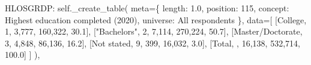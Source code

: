 \documentclass[
  11pt,
  a4paper,
]{article}
\newenvironment{Shaded}{\begin{snugshade}}{\end{snugshade}}
\newcommand{\NormalTok}[1]{\textcolor[rgb]{0.00,0.23,0.31}{#1}}
\newcommand{\OperatorTok}[1]{\textcolor[rgb]{0.37,0.37,0.37}{#1}}
\newcommand{\StringTok}[1]{\textcolor[rgb]{0.13,0.47,0.30}{#1}}
\newcommand{\VariableTok}[1]{\textcolor[rgb]{0.07,0.07,0.07}{#1}}
\begin{document}
\begin{Shaded}
\begin{Highlighting}[]
    \StringTok{\textquotesingle{}HLOSGRDP\textquotesingle{}}\NormalTok{: }\VariableTok{self}\NormalTok{.\_create\_table(}
\NormalTok{        meta}\OperatorTok{=}\NormalTok{\{}
            \StringTok{\textquotesingle{}length\textquotesingle{}}\NormalTok{: }\StringTok{\textquotesingle{}1.0\textquotesingle{}}\NormalTok{, }\StringTok{\textquotesingle{}position\textquotesingle{}}\NormalTok{: }\StringTok{\textquotesingle{}115\textquotesingle{}}\NormalTok{,}
            \StringTok{\textquotesingle{}concept\textquotesingle{}}\NormalTok{: }\StringTok{\textquotesingle{}Highest education completed (2020)\textquotesingle{}}\NormalTok{,}
            \StringTok{\textquotesingle{}universe\textquotesingle{}}\NormalTok{: }\StringTok{\textquotesingle{}All respondents\textquotesingle{}}
\NormalTok{        \},}
\NormalTok{        data}\OperatorTok{=}\NormalTok{[}
\NormalTok{            [}\StringTok{\textquotesingle{}College\textquotesingle{}}\NormalTok{, }\StringTok{\textquotesingle{}1\textquotesingle{}}\NormalTok{, }\StringTok{\textquotesingle{}3,777\textquotesingle{}}\NormalTok{, }\StringTok{\textquotesingle{}160,322\textquotesingle{}}\NormalTok{, }\StringTok{\textquotesingle{}30.1\textquotesingle{}}\NormalTok{],}
\NormalTok{            [}\StringTok{"Bachelor\textquotesingle{}s"}\NormalTok{, }\StringTok{\textquotesingle{}2\textquotesingle{}}\NormalTok{, }\StringTok{\textquotesingle{}7,114\textquotesingle{}}\NormalTok{, }\StringTok{\textquotesingle{}270,224\textquotesingle{}}\NormalTok{, }\StringTok{\textquotesingle{}50.7\textquotesingle{}}\NormalTok{],}
\NormalTok{            [}\StringTok{\textquotesingle{}Master/Doctorate\textquotesingle{}}\NormalTok{, }\StringTok{\textquotesingle{}3\textquotesingle{}}\NormalTok{, }\StringTok{\textquotesingle{}4,848\textquotesingle{}}\NormalTok{, }\StringTok{\textquotesingle{}86,136\textquotesingle{}}\NormalTok{, }\StringTok{\textquotesingle{}16.2\textquotesingle{}}\NormalTok{],}
\NormalTok{            [}\StringTok{\textquotesingle{}Not stated\textquotesingle{}}\NormalTok{, }\StringTok{\textquotesingle{}9\textquotesingle{}}\NormalTok{, }\StringTok{\textquotesingle{}399\textquotesingle{}}\NormalTok{, }\StringTok{\textquotesingle{}16,032\textquotesingle{}}\NormalTok{, }\StringTok{\textquotesingle{}3.0\textquotesingle{}}\NormalTok{],}
\NormalTok{            [}\StringTok{\textquotesingle{}Total\textquotesingle{}}\NormalTok{, }\StringTok{\textquotesingle{}\textquotesingle{}}\NormalTok{, }\StringTok{\textquotesingle{}16,138\textquotesingle{}}\NormalTok{, }\StringTok{\textquotesingle{}532,714\textquotesingle{}}\NormalTok{, }\StringTok{\textquotesingle{}100.0\textquotesingle{}}\NormalTok{]}
\NormalTok{        ]}
\NormalTok{    ),}


\end{Highlighting}
\end{Shaded}
\end{document}
